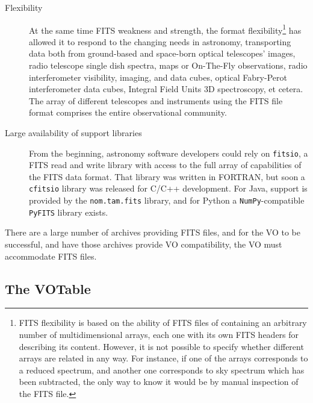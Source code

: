			\begin{description}
				\item[Flexibility] At the same time FITS weakness
				and strength, the format flexibility\footnote{FITS
				flexibility is based on the ability of FITS files
				of containing an arbitrary number of
				multidimensional arrays, each one with its own FITS
				headers for describing its content. However, it is
				not possible to specify whether different arrays
				are related in any way. For instance, if one of the
				arrays corresponds to a reduced spectrum, and
				another one corresponds to sky spectrum which has
				been subtracted, the only way to know it would be
				by manual inspection of the FITS file.} has allowed
				it to respond to the changing needs in astronomy,
				transporting data both from ground-based and
				space-born optical telescopes' images, radio
				telescope single dish spectra, maps or On-The-Fly
				observations, radio interferometer visibility,
				imaging, and data cubes, optical Fabry-Perot
				interferometer data cubes, Integral Field Units 3D
				spectroscopy, et cetera. The array of different
				telescopes and instruments using the FITS file
				format comprises the entire observational
				community.
				
				 \item[Large availability of support libraries]
				From the beginning, astronomy software developers
				could rely on \texttt{fitsio}\urlnote{\fitsiourl},
				a FITS read and write library with access to the
				full array of capabilities of the FITS data format.
				That library was written in FORTRAN, but soon a
				\texttt{cfitsio} library was released for C/C++
				development. For Java, support is provided by the
				\texttt{nom.tam.fits}\urlnote{\nomtamfitsurl}
				library, and for Python a \texttt{NumPy}-compatible
				\texttt{PyFITS}\urlnote{\pyfitsurl} library exists.
			\end{description}

			There are a large number of archives providing FITS
			files, and for the VO to be successful, and have those
			archives provide VO compatibility, the VO must
			accommodate FITS files.


		\subsection{The VOTable} %
		\label{ssub:the_votable}
		
